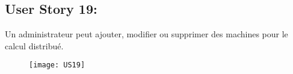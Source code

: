 \newpage
\subsection{User Story 19:}
Un administrateur peut ajouter, modifier ou supprimer des machines pour le calcul distribué.


\begin{figure}[!h]
  \begin{center}
        \texttt{[image: US19]}
        \label{US19-dia}
  \end{center}
\end{figure}
